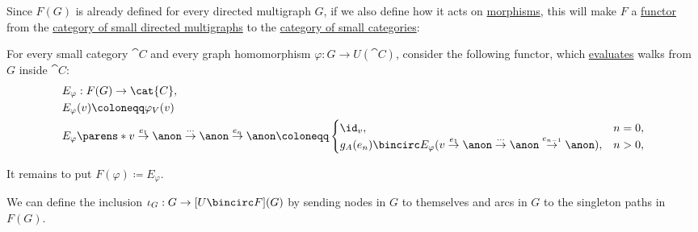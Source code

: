 \begin{definition}
  Since \( F(G) \) is already defined for every directed multigraph \( G \), if we also define how it acts on \hyperref[def:directed_multigraph/morphism]{morphisms}, this will make \( F \) a \hyperref[def:functor]{functor} from the \hyperref[def:directed_multigraph/category]{category of small directed multigraphs} to the \hyperref[def:directed_multigraph/category]{category of small categories}:
  \begin{thmenum}[resume=def:free_category]
     For every small category \( \cat{C} \) and every graph homomorphism \( \varphi: G \to U(\cat{C}) \), consider the following functor, which \hyperref[con:evaluation]{evaluates} walks from \( G \) inside \( \cat{C} \):
    \begin{equation}\label{eq:def:free_category/functor_from_homomorphism}
      \begin{aligned}
        &E_\varphi: F(G) \to \cat{C}, \\
        &E_\varphi(v) \coloneqq \varphi_V(v) \\
        &E_\varphi\parens*{ v \overset {e_1} \to \anon \overset \cdots \to \anon \overset {e_n} \to \anon } \coloneqq \begin{cases}
          \id_v,                                                                                                          &n = 0, \\
          g_A(e_n) \bincirc E_\varphi(v \overset {e_1} \to \anon \overset \cdots \to \anon \overset {e_{n-1}} \to \anon), &n > 0,
        \end{cases}
      \end{aligned}
    \end{equation}

    It remains to put \( F(\varphi) \coloneqq E_\varphi \).

    \mimprovised We can define the inclusion \( \iota_G: G \to [U \bincirc F](G) \) by sending nodes in \( G \) to themselves and arcs in \( G \) to the singleton paths in \( F(G) \).
  \end{thmenum}
\end{definition}

